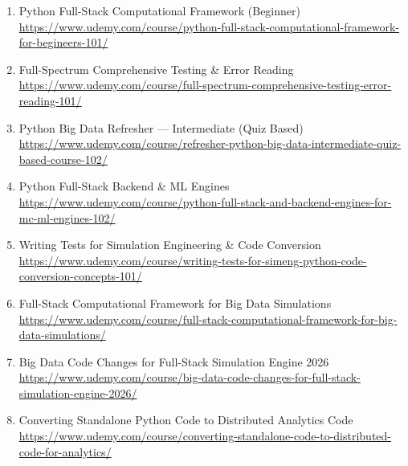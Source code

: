 \documentclass[12pt]{article}
\begin{document}
\begin{enumerate}[label=\textbf{Course \arabic*:}]
		\item Python Full-Stack Computational Framework (Beginner) \\
		\href{https://www.udemy.com/course/python-full-stack-computational-framework-for-begineers-101/}
		{https://www.udemy.com/course/python-full-stack-computational-framework-for-begineers-101/}
		
		\item Full-Spectrum Comprehensive Testing \& Error Reading \\
		\href{https://www.udemy.com/course/full-spectrum-comprehensive-testing-error-reading-101/}
		{https://www.udemy.com/course/full-spectrum-comprehensive-testing-error-reading-101/}

		
		\item Python Big Data Refresher — Intermediate (Quiz Based) \\
		\href{https://www.udemy.com/course/refresher-python-big-data-intermediate-quiz-based-course-102/}
		{https://www.udemy.com/course/refresher-python-big-data-intermediate-quiz-based-course-102/}
		
		\item Python Full-Stack Backend \& ML Engines \\
		\href{https://www.udemy.com/course/python-full-stack-and-backend-engines-for-mc-ml-engines-102/}
		{https://www.udemy.com/course/python-full-stack-and-backend-engines-for-mc-ml-engines-102/}
		
		\item Writing Tests for Simulation Engineering \& Code Conversion \\
		\href{https://www.udemy.com/course/writing-tests-for-simeng-python-code-conversion-concepts-101/}
		{https://www.udemy.com/course/writing-tests-for-simeng-python-code-conversion-concepts-101/}
		
		\item Full-Stack Computational Framework for Big Data Simulations \\
		\href{https://www.udemy.com/course/full-stack-computational-framework-for-big-data-simulations/}
		{https://www.udemy.com/course/full-stack-computational-framework-for-big-data-simulations/}
		
		\item Big Data Code Changes for Full-Stack Simulation Engine 2026 \\
		\href{https://www.udemy.com/course/big-data-code-changes-for-full-stack-simulation-engine-2026/}
		{https://www.udemy.com/course/big-data-code-changes-for-full-stack-simulation-engine-2026/}
		
		\item Converting Standalone Python Code to Distributed Analytics Code \\
		\href{https://www.udemy.com/course/converting-standalone-code-to-distributed-code-for-analytics/}
		{https://www.udemy.com/course/converting-standalone-code-to-distributed-code-for-analytics/}
	\end{enumerate}
	
\end{document}
